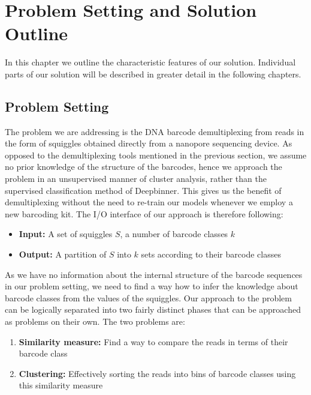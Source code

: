 \chapter{Problem Setting and Solution Outline}

\label{kap:outline} %

In this chapter we outline the characteristic features of our solution. Individual parts of our solution will be described in greater detail in the following chapters.

\section{Problem Setting}
The problem we are addressing is the DNA barcode demultiplexing from reads in the form of squiggles obtained directly from a nanopore sequencing device. As opposed to the demultiplexing tools mentioned in the previous section, we assume no prior knowledge of the structure of the barcodes, hence we approach the problem in an unsupervised manner of cluster analysis, rather than the supervised classification method of Deepbinner. This gives us the benefit of demultiplexing without the need to re-train our models whenever we employ a new barcoding kit. The I/O interface of our approach is therefore following:

\begin{itemize}
    \item \textbf{Input:} A set of squiggles $S$, a number of barcode classes $k$
    \item \textbf{Output:} A partition of $S$ into $k$ sets according to their barcode classes 
\end{itemize}

As we have no information about the internal structure of the barcode sequences in our problem setting, we need to find a way how to infer the knowledge about barcode classes from the values of the squiggles. Our approach to the problem can be logically separated into two fairly distinct phases that can be approached as problems on their own. The two problems are:
\begin{enumerate}
    \item \textbf{Similarity measure:} Find a way to compare the reads in terms of their barcode class
    \item \textbf{Clustering:} Effectively sorting the reads into bins of barcode classes using this similarity measure
\end{enumerate}

